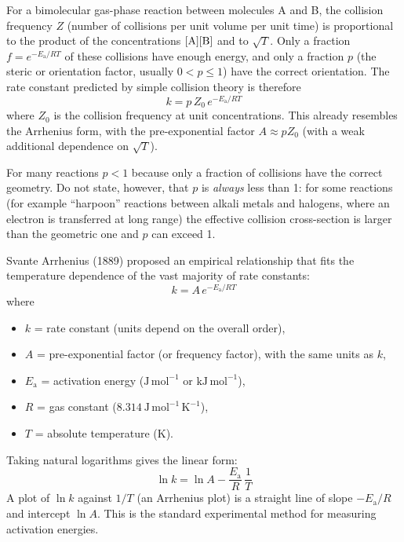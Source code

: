 \documentclass[11pt]{article}
\newcommand{\cle}[1]{{\popxbold\color{popdark}#1}}
\newcounter{popsec}
\newcounter{popsub}
\newcommand{\courssub}[1]{%
  \stepcounter{popsub}%
  \par\vspace{9pt}\noindent{\popxbold\fontsize{11.5}{13}\selectfont\color{popink}{\color{poporange}\thepopsec.\thepopsub}\hspace{6pt}#1}\par\nopagebreak\vspace{4pt}
}
\begin{document}
For a bimolecular gas-phase reaction between molecules A and B, the collision frequency $Z$ (number of collisions per unit volume per unit time) is proportional to the product of the concentrations $[\ce{A}][\ce{B}]$ and to $\sqrt{T}$. Only a fraction $f = e^{-E_{\mathrm{a}}/RT}$ of these collisions have enough energy, and only a fraction $p$ (the \cle{steric} or \cle{orientation factor}, usually $0 < p \le 1$) have the correct orientation. The rate constant predicted by simple collision theory is therefore
\[
k = p\, Z_0\, e^{-E_{\mathrm{a}}/RT}
\]
where $Z_0$ is the collision frequency at unit concentrations. This already resembles the Arrhenius form, with the pre-exponential factor $A \approx pZ_0$ (with a weak additional dependence on $\sqrt{T}$).

\begin{attention}
For many reactions $p < 1$ because only a fraction of collisions have the correct geometry. Do not state, however, that $p$ is \emph{always} less than 1: for some reactions (for example ``harpoon'' reactions between alkali metals and halogens, where an electron is transferred at long range) the effective collision cross-section is larger than the geometric one and $p$ can exceed 1.
\end{attention}

\courssub{The Arrhenius Equation}

Svante Arrhenius (1889) proposed an empirical relationship that fits the temperature dependence of the vast majority of rate constants:
\[
k = A\, e^{-E_{\mathrm{a}}/RT}
\]
where
\begin{itemize}
  \item $k$ = rate constant (units depend on the overall order),
  \item $A$ = \cle{pre-exponential factor} (or frequency factor), with the same units as $k$,
  \item $E_{\mathrm{a}}$ = activation energy ($\mathrm{J\,mol^{-1}}$ or $\mathrm{kJ\,mol^{-1}}$),
  \item $R$ = gas constant ($8.314\ \mathrm{J\,mol^{-1}\,K^{-1}}$),
  \item $T$ = absolute temperature ($\mathrm{K}$).
\end{itemize}

Taking natural logarithms gives the linear form:
\[
\ln k = \ln A - \frac{E_{\mathrm{a}}}{R}\,\frac{1}{T}
\]
A plot of $\ln k$ against $1/T$ (an \cle{Arrhenius plot}) is a straight line of slope $-E_{\mathrm{a}}/R$ and intercept $\ln A$. This is the standard experimental method for measuring activation energies.
\end{document}
